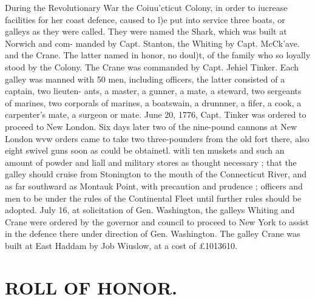 \documentclass{book}
\begin{document}
During the Revolutionary War the Coiuu'cticut Colony, in 
order to iucrease facilities for her coast defence, caused to l)e 
put into service three boats, or galleys as they were called. They 
were named the Shark, which was built at Norwich and com- 
manded by Capt. Stanton, the Whiting by Capt. McCk'ave. and 
the Crane. The latter named in honor, no doul)t, of the family 
who so loyally stood by the Colony. The Crane was commanded 
by Capt. Jehiel Tinker. Each galley was manned with 50 men, 
including officers, the latter consisted of a captain, two lieuten- 
ants, a master, a gunner, a mate, a steward, two sergeants of 
marines, two corporals of marines, a boatswain, a drunnner, a 
fifer, a cook, a carpenter's mate, a surgeon or mate. June 20, 
1776, Capt. Tinker was ordered to proceed to New London. Six 
days later two of the nine-pound cannons at New London wvw 
orders came to take two three-pounders from the old fort there, 
also eight swivel guns soon as could be obtainetl. witli ten 
muskets and such an amount of powder and liall and military 
stores as thought necessary ; that the galley should cruise from 
Stonington to the mouth of the Connecticut River, and as far 
southward as Montauk Point, with precaution and prudence ; 
officers and men to be under the rules of the Continental Fleet 
until further rules should be adopted. July 16, at solicitation of 
Gen. Washington, the galleys Whiting and Crane were ordered 
by the governor and council to proceed to New York to assist in 
the defence there under direction of Gen. Washington. The 
galley Crane was built at East Haddam by Job Wiuslow, at a 
cost of £1013610. 



\chapter{ROLL OF HONOR.}
\end{document}
